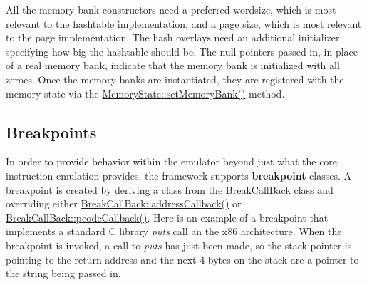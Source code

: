 All the memory bank constructors need a preferred wordsize, which is most relevant to the hashtable implementation, and a page size, which is most relevant to the page implementation. The hash overlays need an additional initializer specifying how big the hashtable should be. The null pointers passed in, in place of a real memory bank, indicate that the memory bank is initialized with all zeroes. Once the memory banks are instantiated, they are registered with the memory state via the \mbox{\hyperlink{class_memory_state_ad1c31dbc7de2dfb6926537c7f9166e92}{Memory\+State\+::set\+Memory\+Bank()}} method.\hypertarget{sleigh_a_p_iemulate_emu_breakpoints}{}\subsection{Breakpoints}\label{sleigh_a_p_iemulate_emu_breakpoints}
In order to provide behavior within the emulator beyond just what the core instruction emulation provides, the framework supports {\bfseries{breakpoint}} classes. A breakpoint is created by deriving a class from the \mbox{\hyperlink{class_break_call_back}{Break\+Call\+Back}} class and overriding either \mbox{\hyperlink{class_break_call_back_adb97ba6b111cb9a84856c9e0f9d506f9}{Break\+Call\+Back\+::address\+Callback()}} or \mbox{\hyperlink{class_break_call_back_a93cd065c519c0e08e2c7729cb649f236}{Break\+Call\+Back\+::pcode\+Callback()}}. Here is an example of a breakpoint that implements a standard C library {\itshape puts} call an the x86 architecture. When the breakpoint is invoked, a call to {\itshape puts} has just been made, so the stack pointer is pointing to the return address and the next 4 bytes on the stack are a pointer to the string being passed in.


